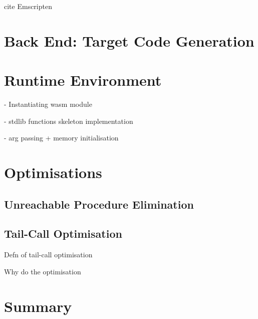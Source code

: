 \documentclass[00-main.tex]{subfiles}
\begin{document}
\begin{mrwComment}
cite Emscripten \cite{emscripten}
\end{mrwComment}

\section{Back End: Target Code Generation}


\section{Runtime Environment}

\begin{mrwComment}
- Instantiating wasm module

- stdlib functions skeleton implementation

- arg passing + memory initialisation
\end{mrwComment}

\section{Optimisations}

\subsection{Unreachable Procedure Elimination}

\subsection{Tail-Call Optimisation}

\begin{mrwComment}
Defn of tail-call optimisation

Why do the optimisation
\end{mrwComment}

\section{Summary}
\end{document}
